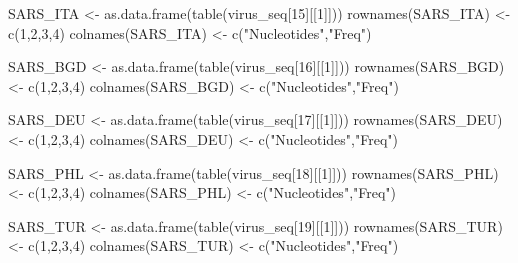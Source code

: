 \documentclass[
]{article}
\newenvironment{Shaded}{\begin{snugshade}}{\end{snugshade}}
\newcommand{\DecValTok}[1]{\textcolor[rgb]{0.00,0.00,0.81}{#1}}
\newcommand{\FunctionTok}[1]{\textcolor[rgb]{0.00,0.00,0.00}{#1}}
\newcommand{\NormalTok}[1]{#1}
\newcommand{\OtherTok}[1]{\textcolor[rgb]{0.56,0.35,0.01}{#1}}
\newcommand{\StringTok}[1]{\textcolor[rgb]{0.31,0.60,0.02}{#1}}
\begin{document}
\begin{Shaded}
\begin{Highlighting}[]
\NormalTok{SARS\_ITA }\OtherTok{\textless{}{-}} \FunctionTok{as.data.frame}\NormalTok{(}\FunctionTok{table}\NormalTok{(virus\_seq[}\DecValTok{15}\NormalTok{][[}\DecValTok{1}\NormalTok{]]))}
\FunctionTok{rownames}\NormalTok{(SARS\_ITA) }\OtherTok{\textless{}{-}} \FunctionTok{c}\NormalTok{(}\DecValTok{1}\NormalTok{,}\DecValTok{2}\NormalTok{,}\DecValTok{3}\NormalTok{,}\DecValTok{4}\NormalTok{)}
\FunctionTok{colnames}\NormalTok{(SARS\_ITA) }\OtherTok{\textless{}{-}} \FunctionTok{c}\NormalTok{(}\StringTok{"Nucleotides"}\NormalTok{,}\StringTok{"Freq"}\NormalTok{)}

\NormalTok{SARS\_BGD }\OtherTok{\textless{}{-}} \FunctionTok{as.data.frame}\NormalTok{(}\FunctionTok{table}\NormalTok{(virus\_seq[}\DecValTok{16}\NormalTok{][[}\DecValTok{1}\NormalTok{]]))}
\FunctionTok{rownames}\NormalTok{(SARS\_BGD) }\OtherTok{\textless{}{-}} \FunctionTok{c}\NormalTok{(}\DecValTok{1}\NormalTok{,}\DecValTok{2}\NormalTok{,}\DecValTok{3}\NormalTok{,}\DecValTok{4}\NormalTok{)}
\FunctionTok{colnames}\NormalTok{(SARS\_BGD) }\OtherTok{\textless{}{-}} \FunctionTok{c}\NormalTok{(}\StringTok{"Nucleotides"}\NormalTok{,}\StringTok{"Freq"}\NormalTok{)}

\NormalTok{SARS\_DEU }\OtherTok{\textless{}{-}} \FunctionTok{as.data.frame}\NormalTok{(}\FunctionTok{table}\NormalTok{(virus\_seq[}\DecValTok{17}\NormalTok{][[}\DecValTok{1}\NormalTok{]]))}
\FunctionTok{rownames}\NormalTok{(SARS\_DEU) }\OtherTok{\textless{}{-}} \FunctionTok{c}\NormalTok{(}\DecValTok{1}\NormalTok{,}\DecValTok{2}\NormalTok{,}\DecValTok{3}\NormalTok{,}\DecValTok{4}\NormalTok{)}
\FunctionTok{colnames}\NormalTok{(SARS\_DEU) }\OtherTok{\textless{}{-}} \FunctionTok{c}\NormalTok{(}\StringTok{"Nucleotides"}\NormalTok{,}\StringTok{"Freq"}\NormalTok{)}

\NormalTok{SARS\_PHL }\OtherTok{\textless{}{-}} \FunctionTok{as.data.frame}\NormalTok{(}\FunctionTok{table}\NormalTok{(virus\_seq[}\DecValTok{18}\NormalTok{][[}\DecValTok{1}\NormalTok{]]))}
\FunctionTok{rownames}\NormalTok{(SARS\_PHL) }\OtherTok{\textless{}{-}} \FunctionTok{c}\NormalTok{(}\DecValTok{1}\NormalTok{,}\DecValTok{2}\NormalTok{,}\DecValTok{3}\NormalTok{,}\DecValTok{4}\NormalTok{)}
\FunctionTok{colnames}\NormalTok{(SARS\_PHL) }\OtherTok{\textless{}{-}} \FunctionTok{c}\NormalTok{(}\StringTok{"Nucleotides"}\NormalTok{,}\StringTok{"Freq"}\NormalTok{)}

\NormalTok{SARS\_TUR }\OtherTok{\textless{}{-}} \FunctionTok{as.data.frame}\NormalTok{(}\FunctionTok{table}\NormalTok{(virus\_seq[}\DecValTok{19}\NormalTok{][[}\DecValTok{1}\NormalTok{]]))}
\FunctionTok{rownames}\NormalTok{(SARS\_TUR) }\OtherTok{\textless{}{-}} \FunctionTok{c}\NormalTok{(}\DecValTok{1}\NormalTok{,}\DecValTok{2}\NormalTok{,}\DecValTok{3}\NormalTok{,}\DecValTok{4}\NormalTok{)}
\FunctionTok{colnames}\NormalTok{(SARS\_TUR) }\OtherTok{\textless{}{-}} \FunctionTok{c}\NormalTok{(}\StringTok{"Nucleotides"}\NormalTok{,}\StringTok{"Freq"}\NormalTok{)}


\end{Highlighting}
\end{Shaded}
\end{document}
